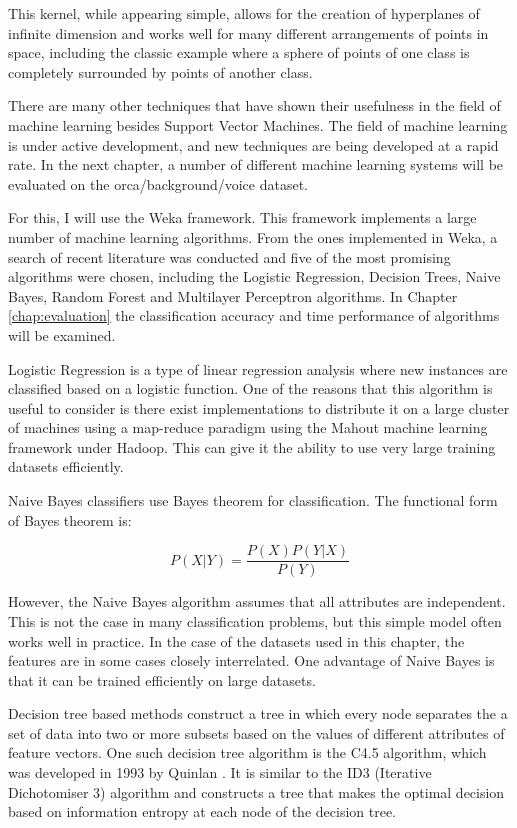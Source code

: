 \documentclass[12pt,oneside]{book}
\begin{document}
This kernel, while appearing simple, allows for the creation of
hyperplanes of infinite dimension and works well for many different
arrangements of points in space, including the classic example where a
sphere of points of one class is completely surrounded by points of
another class.

There are many other techniques that have shown their usefulness in
the field of machine learning besides Support Vector Machines.  The
field of machine learning is under active development, and new
techniques are being developed at a rapid rate.  In the next chapter,
a number of different machine learning systems will be evaluated on
the orca/background/voice dataset.

For this, I will use the Weka \cite{witten2005weka} framework.  This
framework implements a large number of machine learning algorithms.
From the ones implemented in Weka, a search of recent literature was
conducted and five of the most promising algorithms were chosen,
including the Logistic Regression, Decision Trees, Naive Bayes, Random
Forest and Multilayer Perceptron algorithms.  In Chapter
\ref{chap:evaluation} the classification accuracy and time performance
of algorithms will be examined.

Logistic Regression \cite{lecessie1992logisitic} is a type of linear
regression analysis where new instances are classified based on a
logistic function.  One of the reasons that this algorithm is useful
to consider is there exist implementations to distribute it on a large
cluster of machines using a map-reduce paradigm \cite{khuc2012towards}
using the Mahout machine learning framework under Hadoop.  This can
give it the ability to use very large training datasets efficiently.

Naive Bayes classifiers \cite{john1995estimating} use Bayes theorem
for classification.  The functional form of Bayes theorem is:

\begin{equation} 
P(X|Y) = \frac{P(X)P(Y|X)}{P(Y)} 
\end{equation}

However, the Naive Bayes algorithm assumes that all attributes are
independent.  This is not the case in many classification problems,
but this simple model often works well in practice.  In the case of
the datasets used in this chapter, the features are in some cases
closely interrelated.  One advantage of Naive Bayes is that it can be
trained efficiently on large datasets.

Decision tree based methods construct a tree in which every node
separates the a set of data into two or more subsets based on the
values of different attributes of feature vectors. One such decision
tree algorithm is the C4.5 algorithm, which was developed in 1993 by
Quinlan \cite{quinlan1993c45}.  It is similar to the ID3 (Iterative
Dichotomiser 3) algorithm \cite{quinlan1986induction} and constructs a tree that makes
the optimal decision based on information entropy at each node of the
decision tree.
\end{document}
